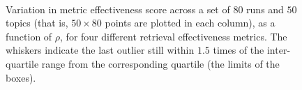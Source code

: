 \begin{figure}[t!]
\centering
{}
\\
\caption{Variation in metric effectiveness score across a set of $80$
runs and $50$ topics (that is, $50 \times 80$ points are plotted in
each column), as a function of $\rho$, for four different retrieval
effectiveness metrics.
The whiskers indicate the last outlier still within $1.5$ times of
the inter-quartile range from the corresponding quartile (the limits
of the boxes).
\label{fig-score-variation}}
\end{figure}

